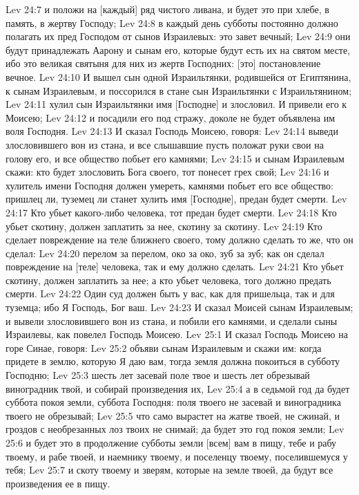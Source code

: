 Lev 24:7  и положи на [каждый] ряд чистого ливана, и будет это при хлебе, в память, в жертву Господу;
Lev 24:8  в каждый день субботы постоянно должно полагать их пред Господом от сынов Израилевых: это завет вечный;
Lev 24:9  они будут принадлежать Аарону и сынам его, которые будут есть их на святом месте, ибо это великая святыня для них из жертв Господних: [это] постановление вечное.
Lev 24:10  И вышел сын одной Израильтянки, родившейся от Египтянина, к сынам Израилевым, и поссорился в стане сын Израильтянки с Израильтянином;
Lev 24:11  хулил сын Израильтянки имя [Господне] и злословил. И привели его к Моисею;
Lev 24:12  и посадили его под стражу, доколе не будет объявлена им воля Господня.
Lev 24:13  И сказал Господь Моисею, говоря:
Lev 24:14  выведи злословившего вон из стана, и все слышавшие пусть положат руки свои на голову его, и все общество побьет его камнями;
Lev 24:15  и сынам Израилевым скажи: кто будет злословить Бога своего, тот понесет грех свой;
Lev 24:16  и хулитель имени Господня должен умереть, камнями побьет его все общество: пришлец ли, туземец ли станет хулить имя [Господне], предан будет смерти.
Lev 24:17  Кто убьет какого-либо человека, тот предан будет смерти.
Lev 24:18  Кто убьет скотину, должен заплатить за нее, скотину за скотину.
Lev 24:19  Кто сделает повреждение на теле ближнего своего, тому должно сделать то же, что он сделал:
Lev 24:20  перелом за перелом, око за око, зуб за зуб; как он сделал повреждение на [теле] человека, так и ему должно сделать.
Lev 24:21  Кто убьет скотину, должен заплатить за нее; а кто убьет человека, того должно предать смерти.
Lev 24:22  Один суд должен быть у вас, как для пришельца, так и для туземца; ибо Я Господь, Бог ваш.
Lev 24:23  И сказал Моисей сынам Израилевым; и вывели злословившего вон из стана, и побили его камнями, и сделали сыны Израилевы, как повелел Господь Моисею.
Lev 25:1  И сказал Господь Моисею на горе Синае, говоря:
Lev 25:2  объяви сынам Израилевым и скажи им: когда придете в землю, которую Я даю вам, тогда земля должна покоиться в субботу Господню;
Lev 25:3  шесть лет засевай поле твое и шесть лет обрезывай виноградник твой, и собирай произведения их,
Lev 25:4  а в седьмой год да будет суббота покоя земли, суббота Господня: поля твоего не засевай и виноградника твоего не обрезывай;
Lev 25:5  что само вырастет на жатве твоей, не сжинай, и гроздов с необрезанных лоз твоих не снимай; да будет это год покоя земли;
Lev 25:6  и будет это в продолжение субботы земли [всем] вам в пищу, тебе и рабу твоему, и рабе твоей, и наемнику твоему, и поселенцу твоему, поселившемуся у тебя;
Lev 25:7  и скоту твоему и зверям, которые на земле твоей, да будут все произведения ее в пищу.
